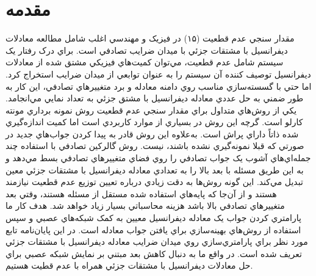 \section*{مقدمه}
مقدار سنجي عدم قطعيت (۱۵) در فيزيک و مهندسي اغلب شامل مطالعه معادلات ديفرانسيل با مشتقات جزئي با ميدان ضرايب تصادفي است. براي درک رفتار يک سيستم شامل عدم قطعيت، مي‌توان کميت‌هاي فيزيکي مشتق شده از معادلات ديفرانسيل توصیف کننده آن سیستم را به عنوان توابعي از ميدان ضرايب استخراج کرد. اما حتي با گسسته‌سازي مناسب روي دامنه معادله و برد متغييرهاي تصادفي، اين کار به طور ضمني به حل عددي معادله ديفرانسيل با مشتق جزئي به تعداد نمايي مي‌انجامد.
يکي از روش‌هاي متداول براي مقدار سنجي عدم قطعيت روش نمونه‌ برداري مونته کارلو است. گرچه اين روش در بسياري از موارد کاربردي است اما کميت اندازه‌گيري شده ذاتاً داراي پراش است. به‌علاوه اين روش قادر به پيدا کردن جواب‌هاي جديد در صورتي که قبلا نمونه‌گيري نشده باشند، نيست.
روش گالرکين تصادفي با استفاده چند جمله‌اي‌هاي آشوب  يک جواب تصادفي را روي فضاي متغييرهاي تصادفي بسط مي‌دهد و به اين طريق مسئله با بعد بالا را به تعدادي معادله ديفرانسيل با مشتقات جزئي معين تبديل مي‌کند. اين گونه روش‌ها به دقت زيادي درباره تعيين توزيع عدم قطعيت نيازمند هستند و از آن‌جا که پايه‌هاي استفاده شده مستقل از مسئله هستند، وقتي بعد متغييرهاي تصادفي بالا باشد هزينه محاسباتي بسيار زياد خواهد شد.
هدف کار ما پارامتري کردن جواب يک معادله ديفرانسيل معيين به کمک شبکه‌هاي عصبي و سپس استفاده از روش‌هاي بهينه‌سازي براي يافتن جواب معادله است. در این پایان‌نامه تابع مورد نظر براي پارامتري‌سازي روي ميدان ضرايب معادله ديفرانسيل با مشتقات جزئي تعريف شده است. در واقع ما به دنبال کاهش بعد مبتني بر نمايش شبکه ‌عصبي براي حل معادلات ديفرانسيل با مشتقات جزئي همراه با عدم قطيت هستیم.
\clearpage
\newpage
